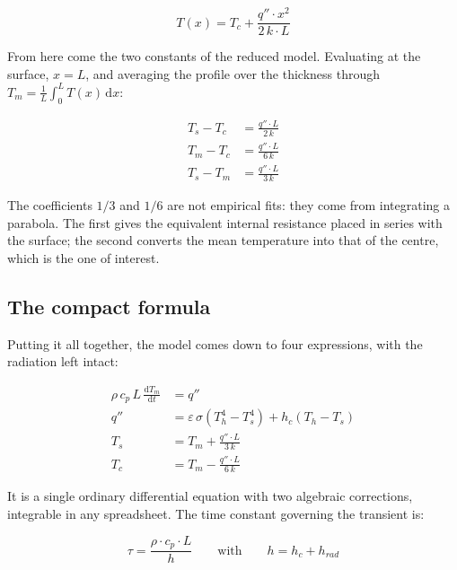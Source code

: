 \documentclass[11pt,a4paper]{article}
\begin{document}
\begin{equation}
T(x) = T_{c} + \frac{q'' \cdot x^{2}}{2\, k \cdot L}
\end{equation}

From here come the two constants of the reduced model. Evaluating at the
surface, $x = L$, and averaging the profile over the thickness through
$T_{m} = \frac{1}{L}\int_{0}^{L} T(x)\,\mathrm{d}x$:

\begin{align}
T_{s} - T_{c} &= \frac{q'' \cdot L}{2\, k} \\[0.3em]
T_{m} - T_{c} &= \frac{q'' \cdot L}{6\, k} \\[0.3em]
T_{s} - T_{m} &= \frac{q'' \cdot L}{3\, k}
\end{align}

The coefficients $1/3$ and $1/6$ are not empirical fits: they come from
integrating a parabola. The first gives the equivalent internal resistance
placed in series with the surface; the second converts the mean temperature
into that of the centre, which is the one of interest.

\subsection{The compact formula}

Putting it all together, the model comes down to four expressions, with the
radiation left intact:

\begin{equation}
\boxed{\;
\begin{aligned}
\rho\, c_p\, L\, \frac{\mathrm{d}T_{m}}{\mathrm{d}t} &= q'' \\[0.2em]
q'' &= \varepsilon\, \sigma \left( T_{h}^{4} - T_{s}^{4} \right)
     + h_{c} \left( T_{h} - T_{s} \right) \\[0.2em]
T_{s} &= T_{m} + \frac{q'' \cdot L}{3\, k} \\[0.2em]
T_{c} &= T_{m} - \frac{q'' \cdot L}{6\, k}
\end{aligned}
\;}
\end{equation}

It is a single ordinary differential equation with two algebraic
corrections, integrable in any spreadsheet. The time constant governing the
transient is:

\begin{equation}
\tau = \frac{\rho \cdot c_p \cdot L}{h}
\qquad \text{with} \qquad
h = h_{c} + h_{rad}
\end{equation}
\end{document}
